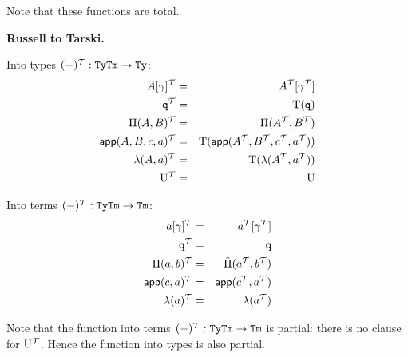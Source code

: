 \documentclass{lmcs}
\def\UU{\mathrm{U}}
\def\Ta{\mathrm{T}}
\def\Pihat{\hat{\Pi}}
\begin{document}
Note that these functions are total.

{\bf Russell to Tarski.} 

Into types $(-)^{\mathcal T} : {\tt Ty}{\tt Tm} \to {\tt Ty}$: 
\begin{eqnarray*}
A[\gamma]^\T&=& A^\T[\gamma^\T]\\
\qI^\T&=& \Ta(\qI)\\
\Pi(A,B)^\T&=& \Pi(A^\T,B^\T)\\
\app(A,B,c,a)^\T &=& \Ta(\app(A^\T,B^\T,c^\T,a^\T))\\
\lambda(A,a)^\T &=& \Ta(\lambda(A^\T,a^\T))\\
\UU^\T &=& \UU
\end{eqnarray*}

Into terms $(-)^{\mathcal T} : {\tt Ty}{\tt Tm} \to {\tt Tm}$: 
\begin{eqnarray*}
a[\gamma]^\T&=& a^\T[\gamma^\T]\\
\qI^\T&=& \qI\\
\Pi(a,b)^\T&=& \Pihat(a^\T,b^\T)\\
\app(c,a)^\T &=& \app(c^\T,a^\T)\\
\lambda(a)^\T &=& \lambda(a^\T)
\end{eqnarray*}

Note that the function into terms $(-)^{\mathcal T} : {\tt Ty}{\tt Tm} \to {\tt Tm}$ is partial: there is no clause for $\UU^\T$. Hence the function into types is also partial.


\end{document}
